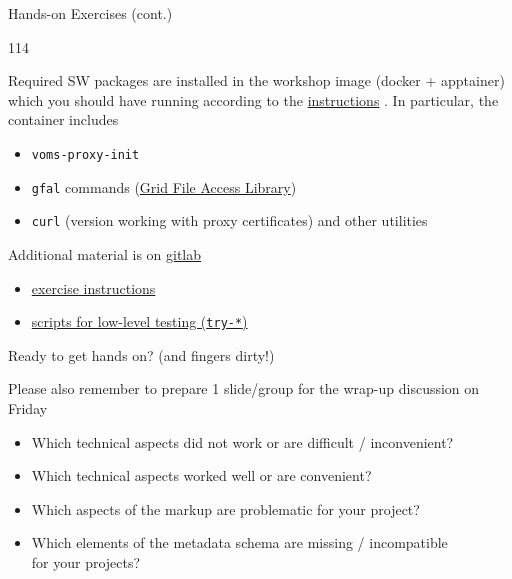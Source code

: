\documentclass[aspectratio=169,xcolor=dvipsnames]{beamer}
\newcommand{\bi}{\begin{itemize}}
\newcommand{\ei}{\end{itemize}}
\begin{document}
\begin{frame}{Hands-on Exercises (cont.)}
  \begin{dinglist}{114}
  \item Required SW packages are installed in the workshop image (docker + apptainer)\\
    which you should have running according to the
    \href{https://gitlab.desy.de/ildg/hands-on/workshop-image/blob/main/README.md}{instructions} .
    In particular, the\\ container includes
    \bi
    \item {\tt voms-proxy-init}
    \item {\tt gfal} commands
      (\href{http://grid-deployment.web.cern.ch/grid-deployment/dms/dmc/docs/gfal2-2.10.2/}{Grid File Access Library})
    \item {\tt curl} (version working with proxy certificates) and other utilities
   \ei
  \item Additional material is on \href{https://gitlab.desy.de/ildg/hands-on}{gitlab}
   \bi
   \item \href{https://gitlab.desy.de/ildg/hands-on/material.git}{exercise instructions}
   \item \href{https://gitlab.desy.de/ildg/hands-on/try-client.git}{scripts for low-level testing ({\tt try-*})}
   \ei
  \item Ready to get hands on? (and fingers dirty!)

  \item Please also remember to prepare 1 slide/group for the wrap-up discussion on Friday 
    \bi
    \item Which technical aspects did not work or are difficult / inconvenient?
    \item Which technical aspects worked well or are convenient?
    \item Which aspects of the markup are problematic for your project?
    \item Which elements of the metadata schema are missing / incompatible\\ for your projects?
   \ei
  \end{dinglist}
  \vfill
\end{frame}
\end{document}
